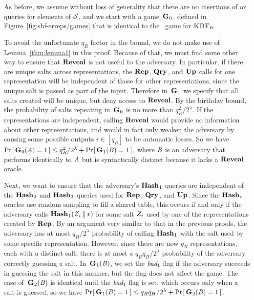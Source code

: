 As before, we assume without loss of generality that there are no insertions of
or queries for elements of $\mathcal{S}$, and we start with a game~$\textup{\textbf{G}}\hspace{0.5pt}_0$, defined
in Figure~\ref{fig:sbf-erreps/games} that is identical to the \erreps\ game for
$\textnormal{\textsc{KBF}}_\mathrm{ft}$.

To avoid the unfortunate $q_R$ factor in the bound, we do not make use of
Lemma~\ref{thm:lemma1} in this proof. Because of that, we must find some other
way to ensure that $\mathbf{Reveal}$ is not useful to the adversary. In particular, if
there are unique salts across representations, the $\textup{\textbf{Rep}}\hspace{0.5pt}$, $\textup{\textbf{Qry}}\hspace{0.5pt}$, and $\textup{\textbf{Up}}\hspace{0.5pt}$
calls for one representation will be independent of those for other
representations, since the unique salt is passed as part of the input. Therefore
in~$\textup{\textbf{G}}\hspace{0.5pt}_1$ we specify that all salts created will be unique, but deny access
to $\mathbf{Reveal}$. By the birthday bound, the probability of salts repeating
in~$\textup{\textbf{G}}\hspace{0.5pt}_0$ is no more than $q_R^2/2^\lambda$. If the representations are
independent, calling $\mathbf{Reveal}$ would provide no information about other
representations, and would in fact only weaken the adversary by causing some
possible outputs $i \in [q_R]$ to be automatic losses. So we have
$\Pr\hspace{-1pt}\left[\,\textup{\textbf{G}}\hspace{0.5pt}_0(\mathit{A}) = 1\,\right] \le q_R^2/2^\lambda + \Pr\hspace{-1pt}\left[\,\textup{\textbf{G}}\hspace{0.5pt}_1(\mathit{B}) = 1\,\right]$,
where $\mathit{B}$ is an adversary that performs identically to $\mathit{A}$ but is
syntactically distinct because it lacks a $\mathbf{Reveal}$ oracle.

Next, we want to ensure that the adversary's $\textup{\textbf{Hash}}\hspace{0.5pt}_1$ queries are independent
of the $\textup{\textbf{Hash}}\hspace{0.5pt}_2$ and $\textup{\textbf{Hash}}\hspace{0.5pt}_3$ queries used for $\textup{\textbf{Rep}}\hspace{0.5pt}$, $\textup{\textbf{Qry}}\hspace{0.5pt}$, and $\textup{\textbf{Up}}\hspace{0.5pt}$.
Since the $\textup{\textbf{Hash}}\hspace{0.5pt}_c$ oracles use random sampling to fill a shared table, this
occurs if and only if the adversary calls
$\textup{\textbf{Hash}}\hspace{0.5pt}_1(Z_i \, \| \, x)$
for some salt $Z_i$ used by one of the representations created by $\textup{\textbf{Rep}}\hspace{0.5pt}$.
By an argument very similar to that in the previous proofs, the adversary has at
most $q_H/2^\lambda$ probability of calling $\textup{\textbf{Hash}}\hspace{0.5pt}_1$ with the salt used by
some specific representation. However, since there are now $q_R$
representations, each with a distinct salt, there is at most a
$q_Rq_H/2^\lambda$ probability of the adversary correctly guessing a salt.
In~$\textup{\textbf{G}}\hspace{0.5pt}_1(\mathit{B})$, we set the $\textit{bad}_1$ flag if the adversary succeeds in
guessing the salt in this manner, but the flag does not affect the game. The
case of~$\textup{\textbf{G}}\hspace{0.5pt}_2(\mathit{B})$ is identical until the $\textit{bad}_1$ flag is set, which
occurs only when a salt is guessed, so we have $\Pr\hspace{-1pt}\left[\,\textup{\textbf{G}}\hspace{0.5pt}_1(\mathit{B}) = 1\,\right] \le
q_Rq_H/2^\lambda + \Pr\hspace{-1pt}\left[\,\textup{\textbf{G}}\hspace{0.5pt}_2(\mathit{B}) = 1\,\right]$.


